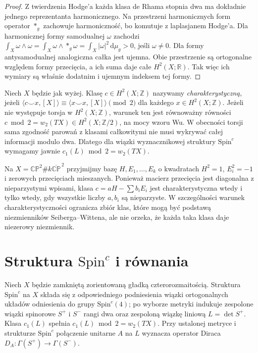 \begin{proof}
Z twierdzenia Hodge'a każda klasa de Rhama stopnia dwa
ma dokładnie jednego reprezentanta harmonicznego.
Na przestrzeni harmonicznych form operator $*_g$ zachowuje
harmoniczność, bo komutuje z laplasjanem Hodge'a.
Dla harmonicznej formy samodualnej $\omega$ zachodzi
$\int_X\omega\wedge\omega=\int_X\omega\wedge*_g\omega
=\int_X|\omega|^2\,\mathrm d\mu_g>0$, jeśli $\omega\ne0$.
Dla formy antysamodualnej analogiczna całka jest ujemna.
Obie przestrzenie są ortogonalne względem formy przecięcia,
a ich suma daje całe $H^2(X;\mathbb R)$.
Tak więc ich wymiary są właśnie dodatnim i ujemnym
indeksem tej formy.
\end{proof}

\begin{definicja}
Niech $X$ będzie jak wyżej. Klasę $c\in H^2(X;\mathbb Z)$
nazywamy \emph{charakterystyczną}, jeżeli
$\langle c\smile x,[X]\rangle\equiv
\langle x\smile x,[X]\rangle\pmod2$
dla każdego $x\in H^2(X;\mathbb Z)$.
Jeżeli nie występuje torsja w $H^2(X;\mathbb Z)$,
warunek ten jest równoważny równości
$c\bmod2=w_2(TX)\in H^2(X;\mathbb Z/2)$,
na mocy wzoru Wu. W obecności torsji sama zgodność
parowań z klasami całkowitymi nie musi wykrywać całej
informacji modulo dwa. Dlatego dla wiązki wyznacznikowej
struktury $\mathrm{Spin}^c$ wymagamy jawnie
$c_1(L)\bmod2=w_2(TX)$.
\end{definicja}

\begin{przyklad}
Na $X=\mathbb{CP}^2\#k\overline{\mathbb{CP}}^{\,2}$
przyjmijmy bazę $H,E_1,\ldots,E_k$ o kwadratach
$H^2=1$, $E_i^2=-1$ i zerowych przecięciach mieszanych.
Ponieważ macierz przecięcia jest diagonalna z nieparzystymi
wpisami, klasa $c=aH-\sum b_iE_i$ jest charakterystyczna
wtedy i tylko wtedy, gdy wszystkie liczby $a,b_i$ są
nieparzyste. W szczególności warunek charakterystyczności
ogranicza zbiór klas, które mogą być podstawą
niezmienników Seiberga--Wittena, ale nie orzeka,
że każda taka klasa daje niezerowy niezmiennik.
\end{przyklad}

\section{Struktura \texorpdfstring{$\mathrm{Spin}^c$}{Spinc} i równania}
\label{sec:tg-sw-equations}

\begin{definicja}
Niech $X$ będzie zamkniętą zorientowaną gładką
czterorozmaitością. Struktura $\mathrm{Spin}^c$ na $X$
składa się z odpowiedniego podniesienia wiązki
ortogonalnych układów odniesienia do grupy
$\mathrm{Spin}^c(4)$; po wyborze metryki indukuje
zespolone wiązki spinorowe $S^+$ i $S^-$ rangi dwa
oraz zespoloną wiązkę liniową $L=\det S^+$.
Klasa $c_1(L)$ spełnia $c_1(L)\bmod2=w_2(TX)$.
Przy ustalonej metryce i strukturze $\mathrm{Spin}^c$
połączenie unitarne $A$ na $L$ wyznacza operator Diraca
$D_A:\Gamma(S^+)\to\Gamma(S^-)$.
\end{definicja}

